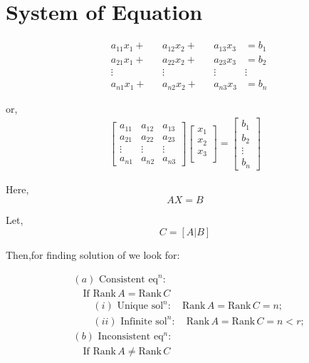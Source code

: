 \documentclass{article}
\begin{document}
\section*{System of Equation}

\begin{align*}
    &a_{11}x_1 + &&a_{12}x_2 + &&a_{13}x_3 &= b_1 \\
    &a_{21}x_1 + &&a_{22}x_2 + &&a_{23}x_3 &= b_2 \\
    &\vdots &&\vdots &&\vdots &\vdots \\
    &a_{n1}x_1 + &&a_{n2}x_2 + &&a_{n3}x_3 &= b_n
\end{align*}

or, 
\begin{align*}
    \begin{bmatrix}
        a_{11} & a_{12} & a_{13} \\
        a_{21} & a_{22} & a_{23} \\
        \vdots & \vdots & \vdots \\
        a_{n1} & a_{n2} & a_{n3}
    \end{bmatrix}
    \begin{bmatrix}
        x_1 \\
        x_2 \\
        x_3 \\
    \end{bmatrix}
    = \begin{bmatrix}
        b_1 \\
        b_2 \\
        \vdots \\
        b_n
    \end{bmatrix}
\end{align*}

Here, \[AX = B\]

Let, \[C = [A|B]\]

Then,for finding solution of we look for:

\begin{align*}
    &(a) \text{ Consistent } \text{eq}^n: \\
    &\quad \text{If } \text{Rank} \, A = \text{Rank} \, C \\
    &\quad \quad (i) \text{ Unique } \text{sol}^n: \quad \text{Rank} \, A = \text{Rank} \, C = n ; \\
    &\quad \quad (ii) \text{ Infinite } \text{sol}^n: \quad \text{Rank} \, A = \text{Rank} \, C = n < r ; \\
    &(b) \text{ Inconsistent } \text{eq}^n: \\
    &\quad \text{If } \text{Rank} \, A \neq \text{Rank} \, C         
\end{align*}
\end{document}
